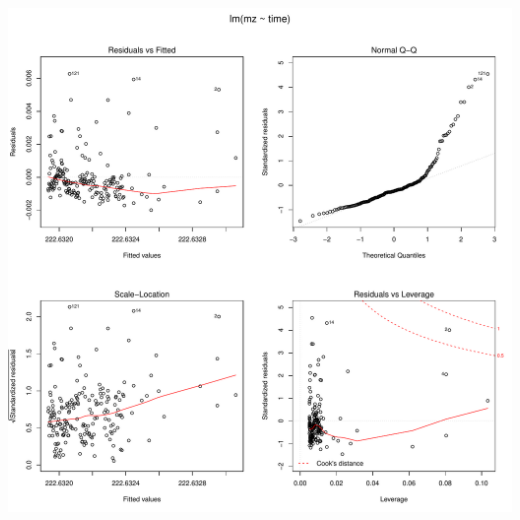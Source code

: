 \documentclass[]{article}
\begin{document}
\includegraphics{Supplementary_document_files/figure-latex/fit.lin.222-1.pdf}
\end{document}
